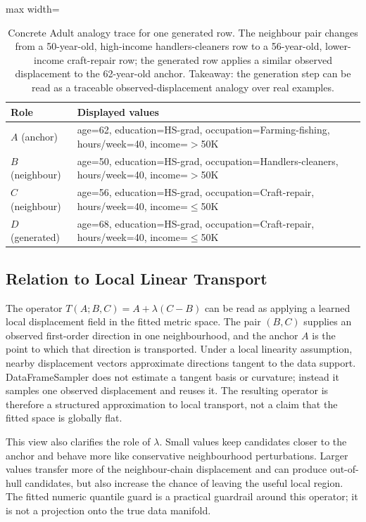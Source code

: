 \begin{table}[t]
\centering
\caption{Concrete Adult analogy trace for one generated row. The neighbour
pair changes from a 50-year-old, high-income handlers-cleaners row to a
56-year-old, lower-income craft-repair row; the generated row applies a similar
observed displacement to the 62-year-old anchor. Takeaway: the generation step
can be read as a traceable observed-displacement analogy over real examples.}
\label{tab:adult-analogy-example}
\small
\begin{adjustbox}{max width=\textwidth}
\begin{tabular}{@{}lp{}@{}}
\toprule
Role & Displayed values \\
\midrule
$A$ (anchor) & age=62, education=HS-grad, occupation=Farming-fishing, hours/week=40, income=$>$50K \\
$B$ (neighbour) & age=50, education=HS-grad, occupation=Handlers-cleaners, hours/week=40, income=$>$50K \\
$C$ (neighbour) & age=56, education=HS-grad, occupation=Craft-repair, hours/week=40, income=$\leq$50K \\
$D$ (generated) & age=68, education=HS-grad, occupation=Craft-repair, hours/week=40, income=$\leq$50K \\
\bottomrule
\end{tabular}
\end{adjustbox}
\end{table}

\subsection{Relation to Local Linear Transport}

The operator $T(A;B,C)=A+\lambda(C-B)$ can be read as applying a learned local
displacement field in the fitted metric space. The pair $(B,C)$ supplies an
observed first-order direction in one neighbourhood, and the anchor $A$ is the
point to which that direction is transported. Under a local linearity
assumption, nearby displacement vectors approximate directions tangent to the
data support. DataFrameSampler does not estimate a tangent basis or curvature;
instead it samples one observed displacement and reuses it. The resulting
operator is therefore a structured approximation to local transport, not a
claim that the fitted space is globally flat.

This view also clarifies the role of $\lambda$. Small values keep candidates
closer to the anchor and behave more like conservative neighbourhood
perturbations. Larger values transfer more of the neighbour-chain displacement
and can produce out-of-hull candidates, but also increase the chance of
leaving the useful local region. The fitted numeric quantile guard is a
practical guardrail around this operator; it is not a projection onto the true
data manifold.

